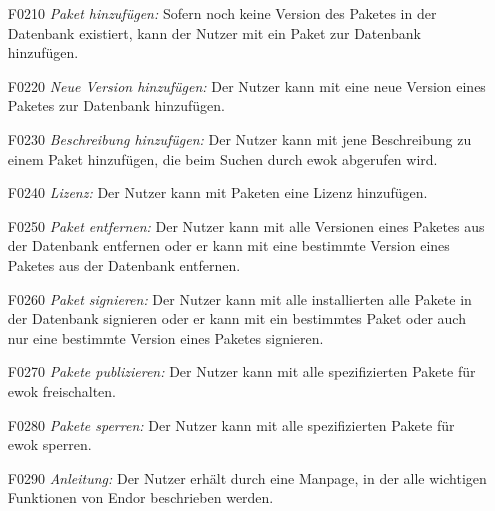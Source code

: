 \begin{itemize}
	\item[F0210] \textit{Paket hinzufügen:} Sofern noch keine Version des Paketes in der Datenbank existiert, kann der Nutzer mit  ein Paket zur Datenbank hinzufügen.
	\item[F0220] \textit{Neue Version hinzufügen:} Der Nutzer kann mit  eine neue Version eines Paketes zur Datenbank hinzufügen.
	\item[F0230] \textit{Beschreibung hinzufügen:} Der Nutzer kann mit  jene Beschreibung zu einem Paket hinzufügen, die beim Suchen durch ewok abgerufen wird.
	\item[F0240] \textit{Lizenz:} Der Nutzer kann mit  Paketen eine Lizenz hinzufügen.
	\item[F0250] \textit{Paket entfernen:} Der Nutzer kann mit  alle Versionen eines Paketes aus der Datenbank entfernen oder er kann mit  eine bestimmte Version eines Paketes aus der Datenbank entfernen.
	\item[F0260] \textit{Paket signieren:} Der Nutzer kann mit  alle installierten alle Pakete in der Datenbank signieren oder er kann mit  ein bestimmtes Paket oder auch nur eine bestimmte Version eines Paketes signieren.
	\item[F0270] \textit{Pakete publizieren:} Der Nutzer kann mit  alle spezifizierten Pakete für ewok freischalten.
	\item[F0280] \textit{Pakete sperren:} Der Nutzer kann mit  alle spezifizierten Pakete für ewok sperren.
	\item[F0290] \textit{Anleitung:} Der Nutzer erhält durch  eine Manpage, in der alle wichtigen Funktionen von Endor beschrieben werden.


\end{itemize}
